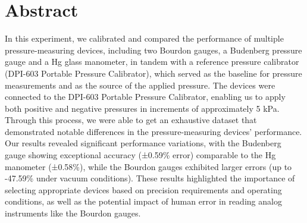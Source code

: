 \documentclass{article}
\newcounter{dataset}
\begin{document}
\section{Abstract}
In this experiment, we calibrated and compared the performance of multiple pressure-measuring devices, including two Bourdon gauges, a Budenberg pressure gauge and a Hg glass manometer, in tandem with a reference pressure calibrator (DPI-603 Portable Pressure Calibrator), which served as the baseline for pressure measurements and as the source of the applied pressure. The devices were connected to the DPI-603 Portable Pressure Calibrator, enabling us to apply both positive and negative pressures in increments of approximately 5 kPa. Through this process, we were able to get an exhaustive dataset that demonstrated notable differences in the pressure-measuring devices' performance. Our results revealed significant performance variations, with the Budenberg gauge showing exceptional accuracy (±0.59\% error) comparable to the Hg manometer (±0.58\%), while the Bourdon gauges exhibited larger errors (up to -47.59\% under vacuum conditions). These results highlighted the importance of selecting appropriate devices based on precision requirements and operating conditions, as well as the potential impact of human error in reading analog instruments like the Bourdon gauges.

	
	\newpage\vspace*{-20pt}
\end{document}

